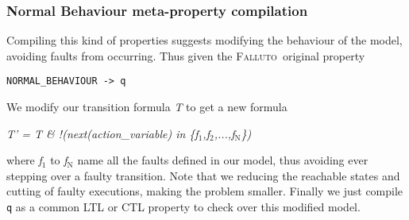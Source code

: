 \documentclass[12pt]{llncs2e/llncs}
\newcommand{\fallutoSp}{\mbox{\textsc{Falluto~}}}
\newcommand{\textusc}[1]{$_{\text{#1}}$} %
\begin{document}
\subsubsection*{Normal Behaviour meta-property compilation}
Compiling this kind of properties suggests modifying the behaviour of the model, avoiding faults from occurring. Thus given the \fallutoSp original property
\begin{center}
\texttt{NORMAL\_BEHAVIOUR -> q}
\end{center}
We modify our transition formula \textit{T} to get a new formula 
\begin{center}
\textit{T' = T \& !(next(action\_variable) in \{f\textusc{1},f\textusc{2},...,f\textusc{N}\})}
\end{center}
where \textit{f\textusc{1}} to \textit{f\textusc{N}} name all the faults defined in our model, thus avoiding ever stepping over a faulty transition. Note that we reducing the reachable states and cutting of faulty executions, making the problem smaller.
Finally we just compile \texttt{q} as a common LTL or CTL property to check over this modified model.
\end{document}
